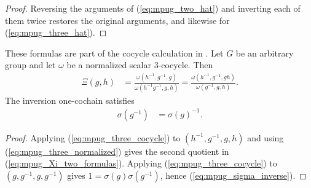 \begin{proof}\leanok
    Reversing the arguments of (\ref{eq:mpug_two_hat}) and inverting each of
    them twice restores the original arguments, and likewise for
    (\ref{eq:mpug_three_hat}).
\end{proof}

\begin{lemma}
    \label{thm:mpug_inversion_cochain_formulas}
    \leanok
    These formulas are part of the cocycle calculation in
    \cite[lines~5967--5979]{FrancoRubio2025MPUGauging}.
    Let $G$ be an arbitrary group and let $\omega$ be a normalized scalar
    $3$-cocycle. Then
    \begin{align}
        \Xi(g,h) & =
        \frac{\omega(h^{-1},g^{-1},g)}
        {\omega(h^{-1}g^{-1},g,h)}
        =
        \frac{\omega(h^{-1},g^{-1},gh)}
        {\omega(g^{-1},g,h)}.
        \label{eq:mpug_Xi_two_formulas}
    \end{align}
    The inversion one-cochain satisfies
    \begin{align}
        \sigma(g^{-1}) & =\sigma(g)^{-1}.
        \label{eq:mpug_sigma_inverse}
    \end{align}
\end{lemma}

\begin{proof}\leanok
    Applying (\ref{eq:mpug_three_cocycle}) to $(h^{-1},g^{-1},g,h)$ and using
    (\ref{eq:mpug_three_normalized}) gives the second quotient in
    (\ref{eq:mpug_Xi_two_formulas}). Applying
    (\ref{eq:mpug_three_cocycle}) to
    $(g,g^{-1},g,g^{-1})$ gives
    $1=\sigma(g)\sigma(g^{-1})$, hence
    (\ref{eq:mpug_sigma_inverse}).
\end{proof}

